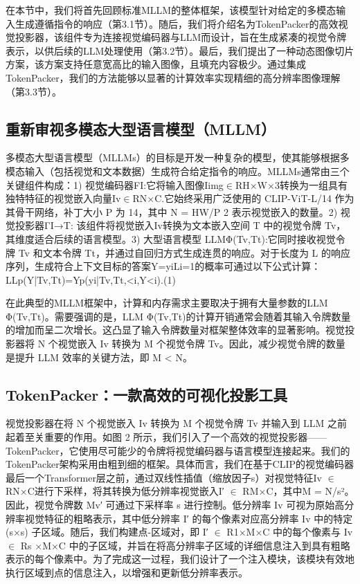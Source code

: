 在本节中，我们将首先回顾标准MLLM的整体框架，该模型针对给定的多模态输入生成遵循指令的响应（第3.1节）。随后，我们将介绍名为TokenPacker的高效视觉投影器，该组件专为连接视觉编码器与LLM而设计，旨在生成紧凑的视觉令牌表示，以供后续的LLM处理使用（第3.2节）。最后，我们提出了一种动态图像切片方案，该方案支持任意宽高比的输入图像，且填充内容极少。通过集成TokenPacker，我们的方法能够以显著的计算效率实现精细的高分辨率图像理解（第3.3节）。

\subsection{重新审视多模态大型语言模型（MLLM）}

多模态大型语言模型（MLLMs）的目标是开发一种复杂的模型，使其能够根据多模态输入（包括视觉和文本数据）生成符合给定指令的响应。MLLMs通常由三个关键组件构成：1) 视觉编码器FI:它将输入图像Iimg$\in$RH×W×3转换为一组具有独特特征的视觉嵌入向量Iv$\in$RN×C.它始终采用广泛使用的 CLIP-ViT-L/14 作为其骨干网络，补丁大小 P 为 14，其中 N = HW/P 2 表示视觉嵌入的数量。2) 视觉投影器ΓI→T: 该组件将视觉嵌入Iv转换为文本嵌入空间 T 中的视觉令牌 Tv，其维度适合后续的语言模型。3) 大型语言模型 LLMΦ(Tv,Tt):它同时接收视觉令牌 Tv 和文本令牌 Tt，并通过自回归方式生成连贯的响应。对于长度为 L 的响应序列，生成符合上下文目标的答案Y={yi}Li=1的概率可通过以下公式计算：LLp(Y|Tv,Tt)=Yp(yi|Tv,Tt,<i,Y<i).(1)

在此典型的MLLM框架中，计算和内存需求主要取决于拥有大量参数的LLM Φ(Tv,Tt)。需要强调的是，LLM Φ(Tv,Tt)的计算开销通常会随着其输入令牌数量的增加而呈二次增长。这凸显了输入令牌数量对框架整体效率的显著影响。视觉投影器将 N 个视觉嵌入 Iv 转换为 M 个视觉令牌 Tv。因此，减少视觉令牌的数量是提升 LLM 效率的关键方法，即 M < N。

\subsection{TokenPacker：一款高效的可视化投影工具}

视觉投影器在将 N 个视觉嵌入 Iv 转换为 M 个视觉令牌 Tv 并输入到 LLM 之前起着至关重要的作用。如图 2 所示，我们引入了一个高效的视觉投影器——TokenPacker，它使用尽可能少的令牌将视觉编码器与语言模型连接起来。我们的TokenPacker架构采用由粗到细的框架。具体而言，我们在基于CLIP的视觉编码器最后一个Transformer层之前，通过双线性插值（缩放因子s）对视觉特征Iv $\in$ RN×C进行下采样，将其转换为低分辨率视觉嵌入I′ $\in$ RM×C，其中M = N/s²。因此，视觉令牌数 Mv′ 可通过下采样率 s 进行控制。低分辨率 Iv 可视为原始高分辨率视觉特征的粗略表示，其中低分辨率 I′ 的每个像素对应高分辨率 Iv 中的特定 (s×s) 子区域。随后，我们构建点-区域对，即 I′ $\in$ R1×M×C 中的每个像素与 Iv $\in$ Rs ×M×C 中的子区域，并旨在将高分辨率子区域的详细信息注入到具有粗略表示的每个像素中。为了完成这一过程，我们设计了一个注入模块，该模块有效地执行区域到点的信息注入，以增强和更新低分辨率表示。

